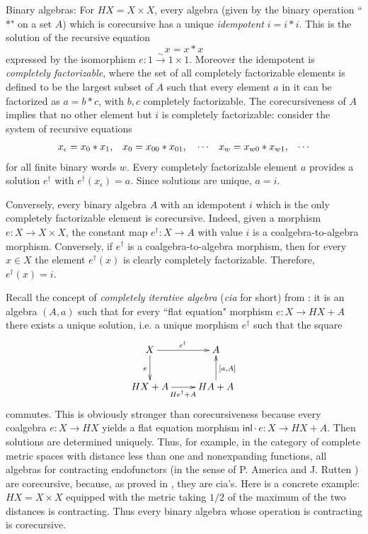 \documentclass{LMCS}
\theoremstyle{plain}
\theoremstyle{definition}
\numberwithin{equation}{section}
\begin{document}
\begin{exa}
  \label{ex:binary}
Binary algebras: For $HX=X\times X$, every algebra  (given by the binary operation ``$*$" on a set $A$) which is corecursive has a unique {\it idempotent} $i=i*i$. This is the solution of the recursive equation $$x=x*x$$
expressed by the isomorphism $e:1\stackrel{\sim}\rightarrow 1\times
1$. Moreover the idempotent is {\it completely factorizable}, where
the set of all completely factorizable elements is defined to be the largest subset of $A$ such that every element $a$ in it can be factorized as $a=b*c$, with $b,c$ completely factorizable. The corecursiveness of $A$ implies  that no other element but $i$ is completely factorizable: consider the system of recursive equations
\begin{align}
x_\epsilon&=x_0*x_1,&
x_0&=x_{00}*x_{01}, &
&\cdots&
x_w&=x_{w 0}*x_{w 1}, &
\cdots\notag
\end{align}
for all finite binary words $w$. Every completely factorizable element $a$ provides a solution $e^\dagger$ with $e^{\dagger}(x_\epsilon )=a$. Since solutions are unique, $a=i$.

Conversely, every binary algebra $A$ with an idempotent $i$ which is the only completely factorizable element is corecursive. Indeed, given a morphism $e:X\rightarrow X\times X$, the constant map $e^{\dagger}:X\rightarrow A$ with value $i$ is a coalgebra-to-algebra morphism. Conversely, if $e^\dagger$ is a coalgebra-to-algebra morphism, then for every $x\in X$ the element $e^\dagger (x)$ is clearly completely factorizable. Therefore, $e^\dagger (x)=i$.
\end{exa}

\begin{rem}\label{cia}
Recall the concept of {\it completely iterative algebra} ({\it cia} for short) from \cite{m_cia}: it is an algebra $(A,a)$ such that for every ``flat equation" morphism $e:X\rightarrow HX+A$ there exists a unique solution, i.e. a unique morphism $e^\dagger$ such that the square
 $$
\xymatrix{
X\ar[r]^{e^\dagger}\ar[d]_{e}&A\\
HX+A\ar[r]_{He^\dagger+A}&HA+A\ar[u]_{[a,A]}
}
$$
commutes. This is obviously stronger than corecursiveness because every coalgebra $e:X\rightarrow HX$ yields a flat equation morphism ${\mathsf{inl}}\cdot e:X\rightarrow HX+A$. Then solutions are determined uniquely. Thus, for example, in the category of complete metric spaces with distance less than one and nonexpanding functions, all algebras for contracting endofunctors (in the sense of P. America and J. Rutten \cite{america+rutten}) are corecursive, because, as proved in \cite{m_cia}, they are cia's. Here is a concrete example: $HX=X\times X$ equipped with the metric taking $1/2$ of the maximum of the two distances is contracting. Thus every binary algebra whose operation is contracting is corecursive.
\end{rem}
\end{document}
